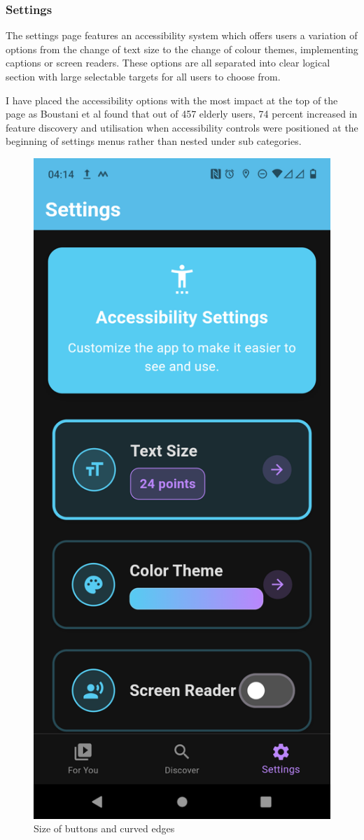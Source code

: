 \documentclass[]{project_final}
\begin{document}
\subsubsection{Settings}
The settings page features an accessibility system which offers users a variation of options from the change of text size to the change of colour themes, implementing captions or screen readers. These options are all separated into clear logical section with large selectable targets for all users to choose from.

I have placed the accessibility options with the most impact at the top of the page as Boustani et al found that out of 457 elderly users, 74 percent increased in feature discovery and utilisation when accessibility controls were positioned at the beginning of settings menus rather than nested under sub categories.

\begin{figure}[ht!]
  \centering
  \includegraphics[height=0.5\textwidth]{mraSetting.png}
  \caption{Size of buttons and curved edges}
  \label{fig:1}
\end{figure}
\end{document}

